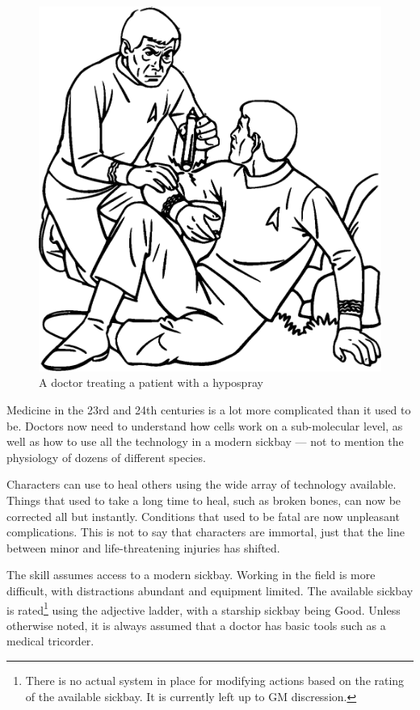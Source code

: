 \documentclass[12pt,titlepage,openany]{book}
\begin{document}
\begin{figure}
    \vspace{-2em}
    \centering
    \includegraphics[width=0.8\linewidth]{img/Medicine.eps}\\
    \vspace{2ex}
    \footnotesize A doctor treating a patient with a hypospray
\end{figure}

Medicine in the 23rd and 24th centuries is a lot more complicated than it used
to be. Doctors now need to understand how cells work on a sub-molecular level,
as well as how to use all the technology in a modern sickbay --- not to mention
the physiology of dozens of different species.

Characters can use  to heal others using the wide array of
technology available. Things that used to take a long time to heal, such as
broken bones, can now be corrected all but instantly. Conditions that used to
be fatal are now unpleasant complications. This is not to say that characters
are immortal, just that the line between minor and life-threatening injuries
has shifted.

The  skill assumes access to a modern sickbay. Working in the
field is more difficult, with distractions abundant and equipment limited. The
available sickbay is rated\footnote{There is no actual system in place for
modifying  actions based on the rating of the available
sickbay. It is currently left up to GM discression.} using the adjective
ladder, with a starship sickbay being Good. Unless otherwise noted, it is
always assumed that a doctor has basic tools such as a medical tricorder.
\end{document}
